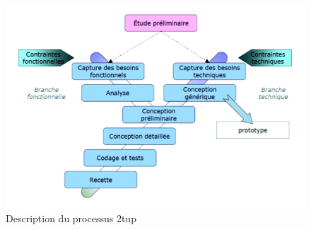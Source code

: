 \documentclass[11pt,a4paper,oneside]{book}
\begin{document}
	\begin{figure}[h]
		\centering
		\includegraphics[width=1\textwidth]{Images/Ch1/2tup}
		\caption{Description du processus 2tup}
		\label{fig:2tup}
	\end{figure}
	
\end{document}
